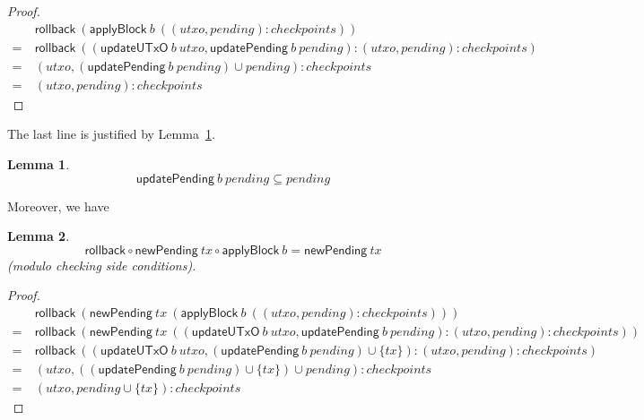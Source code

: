 \documentclass{article}
\newtheorem{lemma}{Lemma}
\begin{document}
\begin{proof}
\begin{align*}
    & \mathsf{rollback} ~ (\mathsf{applyBlock} ~ b ~ ((\mathit{utxo}, \mathit{pending}) : \mathit{checkpoints})) \\
= ~ & \mathsf{rollback} ~ (( \mathsf{updateUTxO} ~ b ~ \mathit{utxo}
         , \mathsf{updatePending} ~ b ~ \mathit{pending}
         )
         : (\mathit{utxo}, \mathit{pending}) : \mathit{checkpoints}
         ) \\
= ~ & (\mathit{utxo}, (\mathsf{updatePending} ~ b ~ \mathit{pending}) \cup \mathit{pending}) : \mathit{checkpoints} \\
= ~ & (\mathit{utxo}, \mathit{pending}) : \mathit{checkpoints}
\end{align*}
\end{proof}

The last line is justified by Lemma~\ref{lemma:updatePending_is_filter}.

\begin{lemma} \label{lemma:updatePending_is_filter}
\begin{equation*}
\mathsf{updatePending} ~ b ~ \mathit{pending} \subseteq \mathit{pending}
\end{equation*}
\end{lemma}

Moreover, we have

\begin{lemma}
\begin{equation*}
\mathsf{rollback} \circ \mathsf{newPending} ~ tx \circ \mathsf{applyBlock} ~ b
= \mathsf{newPending} ~ tx
\end{equation*}
(modulo checking side conditions).
\end{lemma}

\begin{proof}
\begin{align*}
    & \mathsf{rollback} ~ (\mathsf{newPending} ~ tx ~ (\mathsf{applyBlock} ~ b ~ ((\mathit{utxo}, \mathit{pending}) : \mathit{checkpoints}))) \\
= ~ & \mathsf{rollback} ~ (\mathsf{newPending} ~ tx ~ (( \mathsf{updateUTxO} ~ b ~ \mathit{utxo}
         , \mathsf{updatePending} ~ b ~ \mathit{pending}
         )
         : (\mathit{utxo}, \mathit{pending}) : \mathit{checkpoints}
         )) \\
= ~ & \mathsf{rollback} ~ (( \mathsf{updateUTxO} ~ b ~ \mathit{utxo}
         , (\mathsf{updatePending} ~ b ~ \mathit{pending}) \cup \{tx\}
         )
         : (\mathit{utxo}, \mathit{pending}) : \mathit{checkpoints}
         ) \\
= ~ & (\mathit{utxo}, ((\mathsf{updatePending} ~ b ~ \mathit{pending}) \cup \{tx\}) \cup \mathit{pending}) : \mathit{checkpoints} \\
= ~ & (\mathit{utxo}, \mathit{pending} \cup \{tx\}) : \mathit{checkpoints}
\end{align*}
\end{proof}
\end{document}
